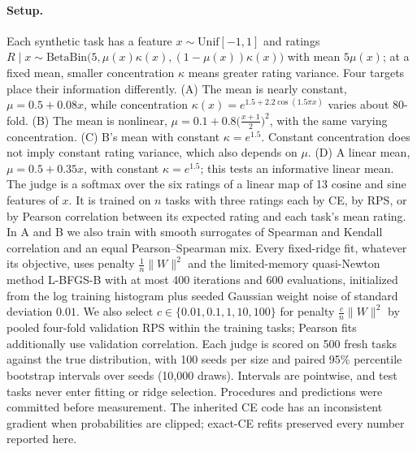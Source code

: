 \paragraph{Setup.}
Each synthetic task has a feature $x\sim\mathrm{Unif}[-1,1]$ and ratings $R\mid x\sim\mathrm{BetaBin}\big(5,\mu(x)\kappa(x),(1-\mu(x))\kappa(x)\big)$ with mean $5\mu(x)$; at a fixed mean, smaller concentration $\kappa$ means greater rating variance.
Four targets place their information differently.
(A) The mean is nearly constant, $\mu=0.5+0.08x$, while concentration $\kappa(x)=e^{1.5+2.2\cos(1.5\pi x)}$ varies about 80-fold.
(B) The mean is nonlinear, $\mu=0.1+0.8\big(\tfrac{x+1}{2}\big)^2$, with the same varying concentration.
(C) B's mean with constant $\kappa=e^{1.5}$.
Constant concentration does not imply constant rating variance, which also depends on $\mu$.
(D) A linear mean, $\mu=0.5+0.35x$, with constant $\kappa=e^{1.5}$; this tests an informative linear mean.
The judge is a softmax over the six ratings of a linear map of 13 cosine and sine features of $x$.
It is trained on $n$ tasks with three ratings each by CE, by RPS, or by Pearson correlation between its expected rating and each task's mean rating.
In A and B we also train with smooth surrogates of Spearman and Kendall correlation and an equal Pearson--Spearman mix.
Every fixed-ridge fit, whatever its objective, uses penalty $\frac{1}{n}\|W\|^2$ and the limited-memory quasi-Newton method L-BFGS-B with at most 400 iterations and 600 evaluations, initialized from the log training histogram plus seeded Gaussian weight noise of standard deviation $0.01$.
We also select $c\in\{0.01,0.1,1,10,100\}$ for penalty $\frac{c}{n}\|W\|^2$ by pooled four-fold validation RPS within the training tasks; Pearson fits additionally use validation correlation.
Each judge is scored on 500 fresh tasks against the true distribution, with 100 seeds per size and paired 95\% percentile bootstrap intervals over seeds (10,000 draws).
Intervals are pointwise, and test tasks never enter fitting or ridge selection.
Procedures and predictions were committed before measurement.
The inherited CE code has an inconsistent gradient when probabilities are clipped; exact-CE refits preserved every number reported here.

